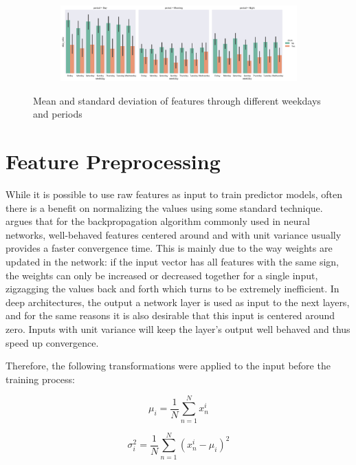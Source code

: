 \documentclass{kththesis}
\begin{document}
\begin{figure}[b]
\begin{subfigure}{0.8\textwidth}
\end{subfigure}  
\begin{subfigure}{0.8\textwidth}
  \centering
    \includegraphics[width=1.0\textwidth, natwidth=580bp, natheight=313bp]{figures/skipratio_vs_weekdays.png}
\end{subfigure}  
    \caption{Mean and standard deviation of features through different weekdays and periods}
    \label{fig:featsweekday}
	\end{figure}

\section{Feature Preprocessing}

While it is possible to use raw features as input to train predictor models, often there is a benefit on normalizing the values using some standard technique. \citep{lecun2012efficient} argues that for the backpropagation algorithm commonly used in neural networks, well-behaved features centered around and with unit variance usually provides a faster convergence time. This is mainly due to the way weights are updated in the network: if the input vector has all features with the same sign, the weights can only be increased or decreased together for a single input, zigzagging the values back and forth which turns to be extremely inefficient. In deep architectures, the output a network layer is used as input to the next layers, and for the same reasons it is also desirable that this input is centered around zero. Inputs with unit variance will keep the layer's output well behaved and thus speed up convergence.

Therefore, the following transformations were applied to the input before the training process:

 \begin{equation}
 \mu_i = \frac{1}{N}\sum_{n=1}^{N}x_n^i
 \end{equation}

\begin{equation}
\sigma_i^2 = \frac{1}{N}\sum_{n=1}^{N}(x_n^i - \mu_i)^2
\end{equation}
 
\end{document}
